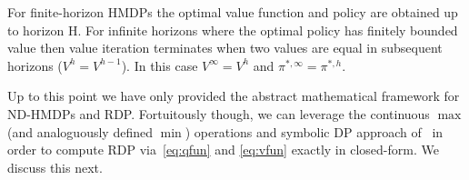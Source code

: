 For finite-horizon HMDPs the optimal value function and policy are
obtained up to horizon H.  For infinite horizons where the optimal policy
has finitely bounded value then value iteration terminates when two
values are equal in subsequent horizons ($V^{h} = V^{h-1}$). In this
case $V^\infty = V^h$ and $\pi^{*,\infty} = \pi^{*,h}$.
 
Up to this point we have only provided the abstract mathematical
framework for ND-HMDPs and RDP.  Fortuitously though, we can leverage
the continuous $\max$ (and analoguously defined $\min$) operations and
symbolic DP approach of~\cite{sdp_aaai} in order to compute RDP 
via~\eqref{eq:qfun} and \eqref{eq:vfun} exactly in closed-form.  We
discuss this next.
